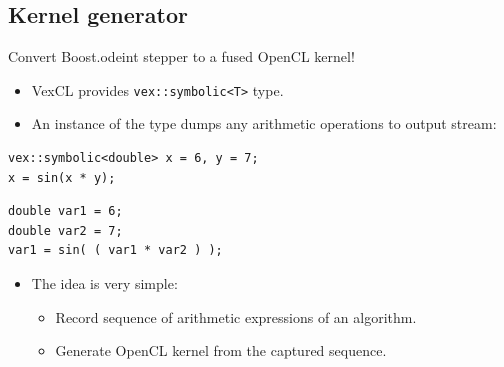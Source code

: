 \documentclass[@BEAMER_OPTIONS@]{beamer}
\newcommand{\code}[1]{\lstinline|#1|}
\begin{document}

\subsection{Kernel generator}

\begin{frame}[fragile]{Convert Boost.odeint stepper to a fused OpenCL kernel!}
    \begin{itemize}
        \item VexCL provides \code{vex::symbolic<T>} type.
        \item An instance of the type dumps any arithmetic operations to output
            stream:
    \end{itemize}
    \begin{exampleblock}{}
        \begin{lstlisting}
vex::symbolic<double> x = 6, y = 7;
x = sin(x * y);
        \end{lstlisting}
    \end{exampleblock}
    \begin{small}
        \begin{verbatim}
double var1 = 6;
double var2 = 7;
var1 = sin( ( var1 * var2 ) );
        \end{verbatim}
    \end{small}
    \pause
    \vspace{-1\baselineskip}
    \begin{itemize}
        \item The idea is very simple:
            \begin{itemize}
                \item Record sequence of arithmetic expressions of an algorithm.
                \item Generate OpenCL kernel from the captured sequence.
            \end{itemize}
    \end{itemize}
\end{frame}
\end{document}
